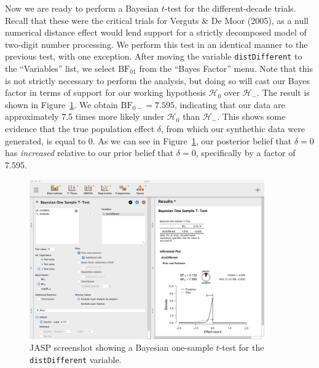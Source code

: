 \documentclass[english,,doc,floatsintext]{apa6}
\begin{document}
Now we are ready to perform a Bayesian \(t\)-test for the different-decade trials. Recall that these were the critical trials for Verguts \& De Moor (2005), as a null numerical distance effect would lend support for a strictly decomposed model of two-digit number processing. We perform this test in an identical manner to the previous test, with one exception. After moving the variable \texttt{distDifferent} to the \enquote{Variables} list, we select \(\text{BF}_{01}\) from the \enquote{Bayes Factor} menu. Note that this is not strictly necessary to perform the analysis, but doing so will cast our Bayes factor in terms of support for our working hypothesis \(\mathcal{H}_{0}\) over \(\mathcal{H}_{-}\). The result is shown in Figure~\ref{fig:ttestBayes2}. We obtain \(\text{BF}_{0-}=7.595\), indicating that our data are approximately 7.5 times more likely under \(\mathcal{H}_{0}\) than \(\mathcal{H}_{-}\). This shows some evidence that the true population effect \(\delta\), from which our synthethic data were generated, is equal to 0. As we can see in Figure~\ref{fig:ttestBayes2}, our posterior belief that \(\delta=0\) has \emph{increased} relative to our prior belief that \(\delta=0\), specifically by a factor of 7.595.

\begin{figure}[htbp]
\centering
\includegraphics[width=0.9\textwidth,height=\textheight]{figures/ttestBayes2.png}
\caption{\label{fig:ttestBayes2}JASP screenshot showing a Bayesian one-sample \(t\)-test for the \texttt{distDifferent} variable.}
\end{figure}
\end{document}
